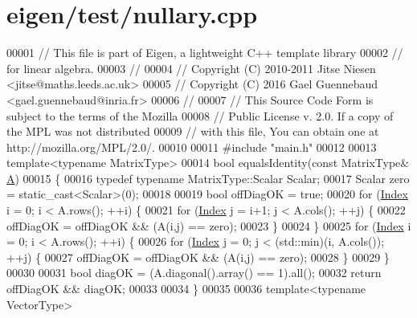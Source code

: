 \hypertarget{eigen_2test_2nullary_8cpp_source}{}\section{eigen/test/nullary.cpp}
\label{eigen_2test_2nullary_8cpp_source}

\begin{DoxyCode}
00001 \textcolor{comment}{// This file is part of Eigen, a lightweight C++ template library}
00002 \textcolor{comment}{// for linear algebra.}
00003 \textcolor{comment}{//}
00004 \textcolor{comment}{// Copyright (C) 2010-2011 Jitse Niesen <jitse@maths.leeds.ac.uk>}
00005 \textcolor{comment}{// Copyright (C) 2016 Gael Guennebaud <gael.guennebaud@inria.fr>}
00006 \textcolor{comment}{//}
00007 \textcolor{comment}{// This Source Code Form is subject to the terms of the Mozilla}
00008 \textcolor{comment}{// Public License v. 2.0. If a copy of the MPL was not distributed}
00009 \textcolor{comment}{// with this file, You can obtain one at http://mozilla.org/MPL/2.0/.}
00010 
00011 \textcolor{preprocessor}{#include "main.h"}
00012 
00013 \textcolor{keyword}{template}<\textcolor{keyword}{typename} MatrixType>
00014 \textcolor{keywordtype}{bool} equalsIdentity(\textcolor{keyword}{const} MatrixType& \hyperlink{group___core___module_class_eigen_1_1_matrix}{A})
00015 \{
00016   \textcolor{keyword}{typedef} \textcolor{keyword}{typename} MatrixType::Scalar Scalar;
00017   Scalar zero = \textcolor{keyword}{static\_cast<}Scalar\textcolor{keyword}{>}(0);
00018 
00019   \textcolor{keywordtype}{bool} offDiagOK = \textcolor{keyword}{true};
00020   \textcolor{keywordflow}{for} (\hyperlink{namespace_eigen_a62e77e0933482dafde8fe197d9a2cfde}{Index} i = 0; i < A.rows(); ++i) \{
00021     \textcolor{keywordflow}{for} (\hyperlink{namespace_eigen_a62e77e0933482dafde8fe197d9a2cfde}{Index} j = i+1; j < A.cols(); ++j) \{
00022       offDiagOK = offDiagOK && (A(i,j) == zero);
00023     \}
00024   \}
00025   \textcolor{keywordflow}{for} (\hyperlink{namespace_eigen_a62e77e0933482dafde8fe197d9a2cfde}{Index} i = 0; i < A.rows(); ++i) \{
00026     \textcolor{keywordflow}{for} (\hyperlink{namespace_eigen_a62e77e0933482dafde8fe197d9a2cfde}{Index} j = 0; j < (std::min)(i, A.cols()); ++j) \{
00027       offDiagOK = offDiagOK && (A(i,j) == zero);
00028     \}
00029   \}
00030 
00031   \textcolor{keywordtype}{bool} diagOK = (A.diagonal().array() == 1).all();
00032   \textcolor{keywordflow}{return} offDiagOK && diagOK;
00033 
00034 \}
00035 
00036 \textcolor{keyword}{template}<\textcolor{keyword}{typename} VectorType>

\end{DoxyCode}

